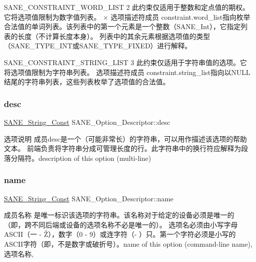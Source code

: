 S\+A\+N\+E\+\_\+\+C\+O\+N\+S\+T\+R\+A\+I\+N\+T\+\_\+\+W\+O\+R\+D\+\_\+\+L\+I\+ST 2 此约束仅适用于整数和定点值的期权。它将选项值限制为数字值列表。 × 选项描述符成员 constraint.\+word\+\_\+list指向枚举合法值的单词列表。该列表中的第一个元素是一个整数（\+S\+A\+N\+E\+\_\+\+Int），它指定列表的长度（不计算长度本身）。 列表中的其余元素根据选项值的类型（\+S\+A\+N\+E\+\_\+\+T\+Y\+P\+E\+\_\+\+I\+N\+T或\+S\+A\+N\+E\+\_\+\+T\+Y\+P\+E\+\_\+\+F\+I\+X\+E\+D）进行解释。

S\+A\+N\+E\+\_\+\+C\+O\+N\+S\+T\+R\+A\+I\+N\+T\+\_\+\+S\+T\+R\+I\+N\+G\+\_\+\+L\+I\+ST 3 此约束仅适用于字符串值的选项。它将选项值限制为字符串列表。 选项描述符成员 constraint.\+string\+\_\+list指向以\+N\+U\+L\+L结尾的字符串列表，这些列表枚举了选项值的合法值。 \mbox{\label{structSANE__Option__Descriptor_a668582efe29f5a4c9aab395afcd6ea18}} 
\subsubsection{\texorpdfstring{desc}{desc}}
{\footnotesize\ttfamily \hyperlink{sane_8h_a9a47323dab2a36db080f1bcc11585af4}{S\+A\+N\+E\+\_\+\+String\+\_\+\+Const} S\+A\+N\+E\+\_\+\+Option\+\_\+\+Descriptor\+::desc}

选项说明 成员desc是一个（可能非常长）的字符串，可以用作描述该选项的帮助文本。 前端负责将字符串分成可管理长度的行。此字符串中的换行符应解释为段落分隔符。description of this option (multi-\/line) \mbox{\label{structSANE__Option__Descriptor_ac4155621a2154ad3160c415fef6ca643}} 
\subsubsection{\texorpdfstring{name}{name}}
{\footnotesize\ttfamily \hyperlink{sane_8h_a9a47323dab2a36db080f1bcc11585af4}{S\+A\+N\+E\+\_\+\+String\+\_\+\+Const} S\+A\+N\+E\+\_\+\+Option\+\_\+\+Descriptor\+::name}

成员名称 是唯一标识该选项的字符串。该名称对于给定的设备必须是唯一的（即，跨不同后端或设备的选项名称不必是唯一的）。 选项名必须由小写字母\+A\+S\+C\+I\+I（一 -\/ Ž），数字（0 -\/ 9）或连字符（-\/ ）只。第一个字符必须是小写的\+A\+S\+C\+I\+I字符（即，不是数字或破折号）。name of this option (command-\/line name), 选项名称, \mbox{\label{structSANE__Option__Descriptor_a0f1bd3fe216630e36c84896ac384a233}} 
